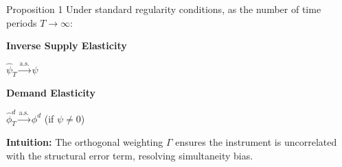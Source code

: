 \documentclass[aspectratio=169,11pt]{beamer}
\begin{document}
\begin{frame}{Proposition 1}
    \vspace{0.5cm}
    \centering
    Under standard regularity conditions, as the number of time periods $T \to \infty$:

    \vspace{0.8cm}
    \begin{minipage}{0.45\textwidth}
        \centering
        \textbf{Inverse Supply Elasticity}

        \vspace{0.4cm}
        $ \hat{\psi}_T \xrightarrow{\text{a.s.}} \psi $
    \end{minipage}
    \hfill
    \begin{minipage}{0.45\textwidth}
        \centering
        \textbf{Demand Elasticity}

        \vspace{0.4cm}
        $ \hat{\phi}^d_T \xrightarrow{\text{a.s.}} \phi^d $ \quad (if $\psi \neq 0$)
    \end{minipage}

    \vspace{1cm}
    \textbf{Intuition:} The orthogonal weighting $\Gamma$ ensures the instrument is uncorrelated with the structural error term, resolving simultaneity bias.
    \vspace{0.1cm}
    \hfill \hyperlink{src_propositions}{}
\end{frame}
\end{document}

